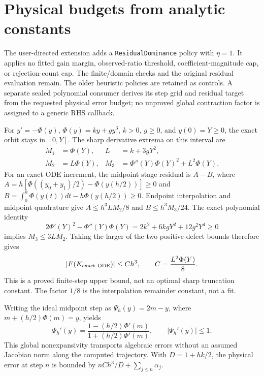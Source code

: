 \section{Physical budgets from analytic constants}

The user-directed extension adds a \texttt{ResidualDominance} policy with
$\eta=1$. It applies no fitted gain margin, observed-ratio threshold,
coefficient-magnitude cap, or rejection-count cap. The finite/domain checks
and the original residual evaluation remain. The older heuristic policies
are retained as controls. A separate sealed polynomial consumer derives its
step grid and residual target from the requested physical error budget;
no unproved global contraction factor is assigned to a generic RHS callback.

For $y'=-\Phi(y)$, $\Phi(y)=ky+gy^3$, $k>0$, $g\ge0$, and $y(0)=Y\ge0$,
the exact orbit stays in $[0,Y]$. The sharp derivative extrema on this interval
are
\begin{align}
M_1&=\Phi(Y),& L&=k+3gY^2,\\
M_2&=L\Phi(Y),&
M_3&=\Phi''(Y)\Phi(Y)^2+L^2\Phi(Y).
\end{align}
For an exact ODE increment, the midpoint stage residual is $A-B$, where
$A=h[\Phi((y_0+y_1)/2)-\Phi(y(h/2))]\ge0$ and
$B=\int_0^h\Phi(y(t))dt-h\Phi(y(h/2))\ge0$. Endpoint interpolation and
midpoint quadrature give $A\le h^3LM_2/8$ and $B\le h^3M_3/24$.
The exact polynomial identity
\begin{equation}
2\Phi'(Y)^2-\Phi''(Y)\Phi(Y)=2k^2+6kgY^2+12g^2Y^4\ge0
\end{equation}
implies $M_3\le3LM_2$. Taking the larger of the two positive-defect bounds
therefore gives
\begin{equation}
|F(K_{\rm exact\ ODE})|\le Ch^3,\qquad
C=\frac{L^2\Phi(Y)}8.
\end{equation}
This is a proved finite-step upper bound, not an optimal sharp truncation
constant. The factor $1/8$ is the interpolation remainder constant, not a fit.

Writing the ideal midpoint step as $\Psi_h(y)=2m-y$, where
$m+(h/2)\Phi(m)=y$, yields
\begin{equation}
\Psi_h'(y)=\frac{1-(h/2)\Phi'(m)}{1+(h/2)\Phi'(m)},
\qquad |\Psi_h'(y)|\le1.
\end{equation}
This global nonexpansivity transports algebraic errors without an assumed
Jacobian norm along the computed trajectory. With $D=1+hk/2$, the physical
error at step $n$ is bounded by $nCh^3/D+\sum_{j\le n}\alpha_j$.

